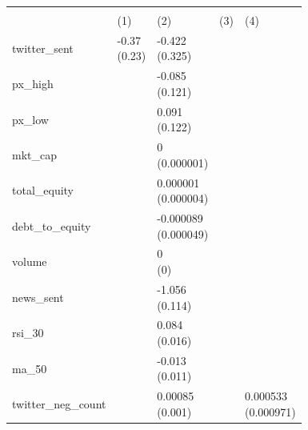 \begin{threeparttable}
\begingroup
\renewcommand\cellalign{t}
\renewcommand\arraystretch{1}
\setlength{\tabcolsep}{3pt}
\begin{tabularx}{\linewidth}{@{}>{\raggedright\arraybackslash}l>{\centering\arraybackslash}X>{\centering\arraybackslash}X>{\centering\arraybackslash}X>{\centering\arraybackslash}X}
\toprule
 & \multicolumn{4}{c}{return} \\
\cmidrule(lr){2-5}
 & (1) & (2) & (3) & (4) \\
\midrule
\addlinespace[1ex]
twitter_sent & \makecell{-0.37 \\ (0.23)} & \makecell{-0.422 \\ (0.325)} &  &  \\
\addlinespace[0.5ex]
\addlinespace[0.5ex]
px_high &  & \makecell{-0.085 \\ (0.121)} &  &  \\
\addlinespace[0.5ex]
\addlinespace[0.5ex]
px_low &  & \makecell{0.091 \\ (0.122)} &  &  \\
\addlinespace[0.5ex]
\addlinespace[0.5ex]
mkt_cap &  & \makecell{0 \\ (0.000001)} &  &  \\
\addlinespace[0.5ex]
\addlinespace[0.5ex]
total_equity &  & \makecell{0.000001 \\ (0.000004)} &  &  \\
\addlinespace[0.5ex]
\addlinespace[0.5ex]
debt_to_equity &  & \makecell{-0.000089 \\ (0.000049)} &  &  \\
\addlinespace[0.5ex]
\addlinespace[0.5ex]
volume &  & \makecell{0 \\ (0)} &  &  \\
\addlinespace[0.5ex]
\addlinespace[0.5ex]
news_sent &  & \makecell{-1.056 \\ (0.114)} &  &  \\
\addlinespace[0.5ex]
\addlinespace[0.5ex]
rsi_30 &  & \makecell{0.084 \\ (0.016)} &  &  \\
\addlinespace[0.5ex]
\addlinespace[0.5ex]
ma_50 &  & \makecell{-0.013 \\ (0.011)} &  &  \\
\addlinespace[0.5ex]
\addlinespace[0.5ex]
twitter_neg_count &  & \makecell{0.00085 \\ (0.001)} &  & \makecell{0.000533 \\ (0.000971)} \\

\end{tabularx}
\end{threeparttable}
